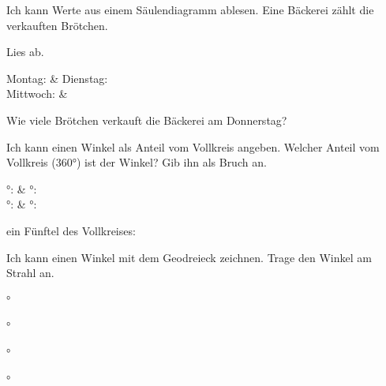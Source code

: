 \begin{aufgabe}{Ich kann Werte aus einem Säulendiagramm ablesen.}
Eine Bäckerei zählt die verkauften Brötchen.


Lies ab.
\begin{teilezwei}
\tz Montag: \leerfeld[Tausend] & \tz Dienstag: \leerfeld[Tausend] \\
\tz Mittwoch: \leerfeld[Tausend] & \\
\end{teilezwei}
\begin{teile}
\teil Wie viele Brötchen verkauft die Bäckerei am Donnerstag? \hfill \leerfeld[Brötchen]
\end{teile}
\end{aufgabe}

\begin{aufgabe}{Ich kann einen Winkel als Anteil vom Vollkreis angeben.}
Welcher Anteil vom Vollkreis (360°) ist der Winkel? Gib ihn als Bruch an.
\begin{teilezwei}
°: \leerfeld & °: \leerfeld \\
°: \leerfeld & °: \leerfeld \\
\end{teilezwei}

\begin{teile}
\teil ein Fünftel des Vollkreises: \leerfeld[°]
\end{teile}
\end{aufgabe}

\begin{aufgabe}{Ich kann einen Winkel mit dem Geodreieck zeichnen.}
Trage den Winkel am Strahl an.

\noindent\begin{minipage}[t]{0.48\linewidth}
\begin{teile}°\end{teile}
\winkelstrahl[6]
\end{minipage}\hfill
\begin{minipage}[t]{0.48\linewidth}
\begin{teile}°\end{teile}
\winkelstrahl[6]
\end{minipage}

\noindent\begin{minipage}[t]{0.48\linewidth}
\begin{teile}°\end{teile}
\winkelstrahl[6]
\end{minipage}\hfill
\begin{minipage}[t]{0.48\linewidth}
\begin{teile}°\end{teile}
\winkelstrahl[6]
\end{minipage}
\end{aufgabe}

